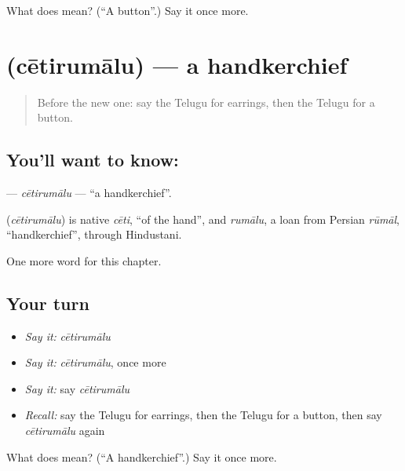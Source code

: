 \begin{tcolorbox}[breakable,colback=teal!4,colframe=teal!35!black,title={Before you move on}]
What does  mean? (\textquotedblleft{}A button\textquotedblright{}.) Say it once more.
\end{tcolorbox}
\section[\texorpdfstring{\te{చేతిరుమాలు} (cētirumālu)}{చేతిరుమాలు (cētirumālu)}]{ (cētirumālu) — a handkerchief}

\label{lesson:TE-C300-cetirumalu}



\begin{quote}
Before the new one: say the Telugu for earrings, then the Telugu for a button.
\end{quote}

\subsection*{You'll want to know: }
\textbf{} — \emph{cētirumālu} — \textquotedblleft{}a handkerchief\textquotedblright{}.

\begin{cousinweb}
\textbf{} (\emph{cētirumālu}) is native \emph{cēti}, \textquotedblleft{}of the hand\textquotedblright{}, and \emph{rumālu}, a loan from Persian \emph{rūmāl}, \textquotedblleft{}handkerchief\textquotedblright{}, through Hindustani.
\end{cousinweb}

\begin{grammarlens}[title={What you've built}]
One more word for this chapter.
\end{grammarlens}

\subsection*{Your turn}
\begin{itemize}
\raggedright
  \item \emph{Say it:} \emph{cētirumālu}
  \item \emph{Say it:} \emph{cētirumālu}, once more
  \item \emph{Say it:} say \emph{cētirumālu}
  \item \emph{Recall:} say the Telugu for earrings, then the Telugu for a button, then say \emph{cētirumālu} again
\end{itemize}

\begin{tcolorbox}[breakable,colback=teal!4,colframe=teal!35!black,title={Before you move on}]
What does  mean? (\textquotedblleft{}A handkerchief\textquotedblright{}.) Say it once more.
\end{tcolorbox}
